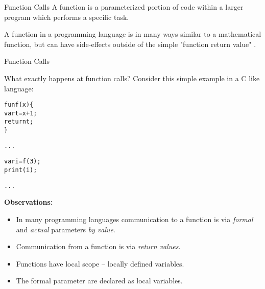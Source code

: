 \documentclass{beamer}
\begin{document}
\begin{frame}[fragile]{Function Calls}
A function is a parameterized portion of code within a larger program which performs a specific task. 
\vspace{.1in}

A function in a programming language is  in many ways similar to a mathematical function, but can have side-effects outside of the simple "function return value" .
\end{frame}

\begin{frame}[fragile]{Function Calls}

\small
What exactly happens at function calls?  Consider this simple example in a C like language:

\vspace{.1in}

\begin{minipage}{1.3in}
\begin{alltt}\scriptsize
fun f (x) \{
    var t = x + 1;
    return t;
\}

...

var i = f(3);
print(i);

...

\end{alltt}
\end{minipage}
\begin{minipage}{2.9in}
{\bf Observations:} 
\begin{itemize}
\item In many programming languages communication to a function is via {\em formal} and {\em actual} parameters {\em by value}.  
\item Communication from a function is via {\em return values}.
\item Functions have local scope -- locally defined variables.
\item The formal parameter are declared as local variables.
\end{itemize}
\end{minipage}
\end{frame}
\end{document}
